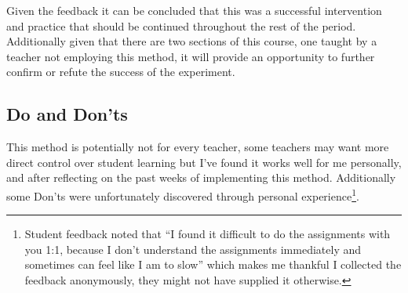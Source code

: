\documentclass[paper=a4,justified,a4paper]{tufte-handout}
\begin{document}
Given the feedback it can be concluded that this was a successful
intervention and practice that should be continued throughout the rest
of the period. Additionally given that there are two sections of this
course, one taught by a teacher not employing this method, it will
provide an opportunity to further confirm or refute the success of the
experiment.

\hypertarget{do-and-donts}{%
\subsection{Do and Don'ts}\label{do-and-donts}}

This method is potentially not for every teacher, some teachers may want
more direct control over student learning but I've found it works well
for me personally, and after reflecting on the past weeks of
implementing this method. Additionally some Don'ts were unfortunately
discovered through personal experience\footnote{Student feedback noted
  that ``I found it difficult to do the assignments with you 1:1,
  because I don't understand the assignments immediately and sometimes
  can feel like I am to slow'' which makes me thankful I collected the
  feedback anonymously, they might not have supplied it otherwise.}.
\end{document}
